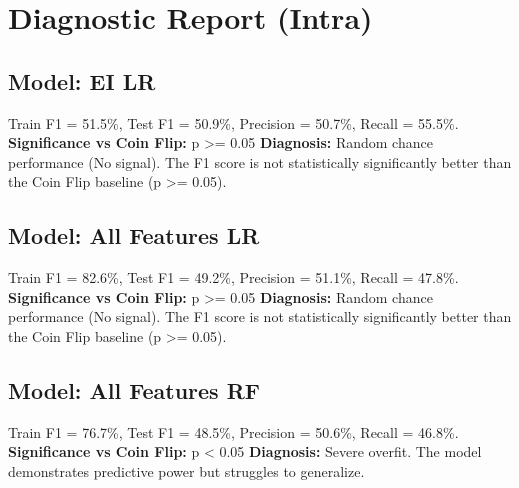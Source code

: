 \section*{Diagnostic Report (Intra)}
\subsection*{Model: EI LR}
Train F1 = 51.5\%, Test F1 = 50.9\%, Precision = 50.7\%, Recall = 55.5\%.
\newline
\textbf{Significance vs Coin Flip:} p >= 0.05
\newline
\textbf{Diagnosis:} Random chance performance (No signal). The F1 score is not statistically significantly better than the Coin Flip baseline (p >= 0.05).

\subsection*{Model: All Features LR}
Train F1 = 82.6\%, Test F1 = 49.2\%, Precision = 51.1\%, Recall = 47.8\%.
\newline
\textbf{Significance vs Coin Flip:} p >= 0.05
\newline
\textbf{Diagnosis:} Random chance performance (No signal). The F1 score is not statistically significantly better than the Coin Flip baseline (p >= 0.05).

\subsection*{Model: All Features RF}
Train F1 = 76.7\%, Test F1 = 48.5\%, Precision = 50.6\%, Recall = 46.8\%.
\newline
\textbf{Significance vs Coin Flip:} p < 0.05
\newline
\textbf{Diagnosis:} Severe overfit. The model demonstrates predictive power but struggles to generalize.

